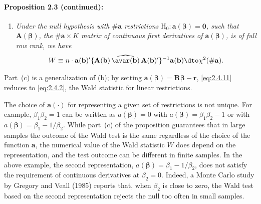 \paragraph{Proposition 2.3 (continued):}

\begin{enumerate}[label=(\alph*), start=3]
  \item \emph{Under the null hypothesis with $\#\mathbf{a}$ restrictions
    $\mathrm{H}_0\colon \mathbf{a}(\bm{\beta}) = \mathbf{0}$, such that
    $\mathbf{A}(\bm{\beta})$, the $\#\mathbf{a} \times K$ matrix of continuous first
    derivatives of\/ $\mathbf{a}(\bm{\beta})$, is of full row rank, we have}
    \begin{equation}
      W \equiv n \cdot \mathbf{a}(\mathbf{b})'
      \{\mathbf{A}(\mathbf{b})\,\widehat{\avar(\mathbf{b})}\,
      \mathbf{A}(\mathbf{b})'\}^{-1}
      \mathbf{a}(\mathbf{b})
      \dto \chi^2(\#\mathbf{a}).
      \label{eq:2.4.11}
    \end{equation}
\end{enumerate}

Part~(c) is a generalization of (b); by setting
$\mathbf{a}(\bm{\beta}) = \mathbf{R}\bm{\beta} - \mathbf{r}$,
\eqref{eq:2.4.11} reduces to \eqref{eq:2.4.2}, the Wald statistic for linear
restrictions.

The choice of $\mathbf{a}(\cdot)$ for representing a given set of restrictions is not
unique.  For example, $\beta_1\beta_2 = 1$ can be written as
$a(\bm{\beta}) = 0$ with $a(\bm{\beta}) = \beta_1\beta_2 - 1$ or with
$a(\bm{\beta}) = \beta_1 - 1/\beta_2$.  While part~(c) of the proposition guarantees
that in large samples the outcome of the Wald test is the same regardless of the
choice of the function $\mathbf{a}$, the numerical value of the Wald statistic $W$
does depend on the representation, and the test outcome can be different in finite
samples.  In the above example, the second representation,
$a(\bm{\beta}) = \beta_1 - 1/\beta_2$, does not satisfy the requirement of continuous
derivatives at $\beta_2 = 0$.  Indeed, a Monte Carlo study by Gregory and Veall
(1985) reports that, when $\beta_2$ is close to zero, the Wald test based on the
second representation rejects the null too often in small samples.
